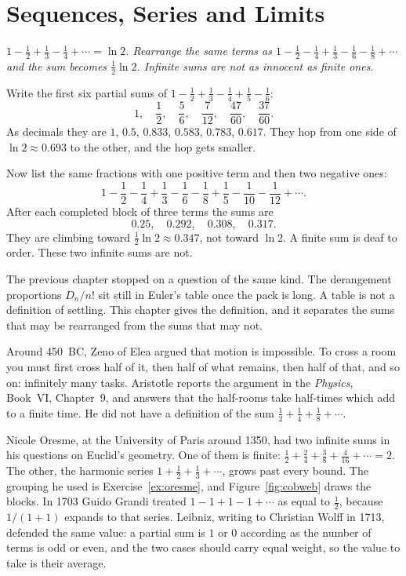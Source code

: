 \chapter{Sequences, Series and Limits}\label{ch:sequences}

\begin{center}\itshape
$1-\frac12+\frac13-\frac14+\cdots=\ln2$. Rearrange the same terms as $1-\frac12-\frac14+\frac13-\frac16-\frac18+\cdots$\\
and the sum becomes $\frac12\ln2$. Infinite sums are not as innocent as finite ones.
\end{center}

Write the first six partial sums of $1-\frac12+\frac13-\frac14+\frac15-\frac16$:
\[
1,\quad \frac12,\quad \frac56,\quad \frac7{12},\quad \frac{47}{60},\quad \frac{37}{60}.
\]
As decimals they are $1$, $0.5$, $0.833$, $0.583$, $0.783$, $0.617$. They hop from one side of $\ln2\approx0.693$ to the other, and the hop gets smaller.

Now list the same fractions with one positive term and then two negative ones:
\[
1-\frac12-\frac14+\frac13-\frac16-\frac18+\frac15-\frac1{10}-\frac1{12}+\cdots.
\]
After each completed block of three terms the sums are
\[
0.25,\quad 0.292,\quad 0.308,\quad 0.317.
\]
They are climbing toward $\frac12\ln2\approx0.347$, not toward $\ln2$. A finite sum is deaf to order. These two infinite sums are not.

The previous chapter stopped on a question of the same kind. The derangement proportions $D_n/n!$ sit still in Euler's table once the pack is long. A table is not a definition of settling. This chapter gives the definition, and it separates the sums that may be rearranged from the sums that may not.


Around 450~BC, Zeno of Elea argued that motion is impossible. To cross a room you must first cross half of it, then half of what remains, then half of that, and so on: infinitely many tasks. Aristotle reports the argument in the \emph{Physics}, Book~VI, Chapter~9, and answers that the half-rooms take half-times which add to a finite time. He did not have a definition of the sum $\frac12+\frac14+\frac18+\cdots$.

Nicole Oresme, at the University of Paris around 1350, had two infinite sums in his questions on Euclid's geometry. One of them is finite: $\frac12+\frac24+\frac38+\frac4{16}+\cdots=2$. The other, the harmonic series $1+\frac12+\frac13+\cdots$, grows past every bound. The grouping he used is Exercise~\ref{ex:oresme}, and Figure~\ref{fig:cobweb} draws the blocks. In 1703 Guido Grandi treated $1-1+1-1+\cdots$ as equal to $\frac12$, because $1/(1+1)$ expands to that series. Leibniz, writing to Christian Wolff in 1713, defended the same value: a partial sum is $1$ or $0$ according as the number of terms is odd or even, and the two cases should carry equal weight, so the value to take is their average.

